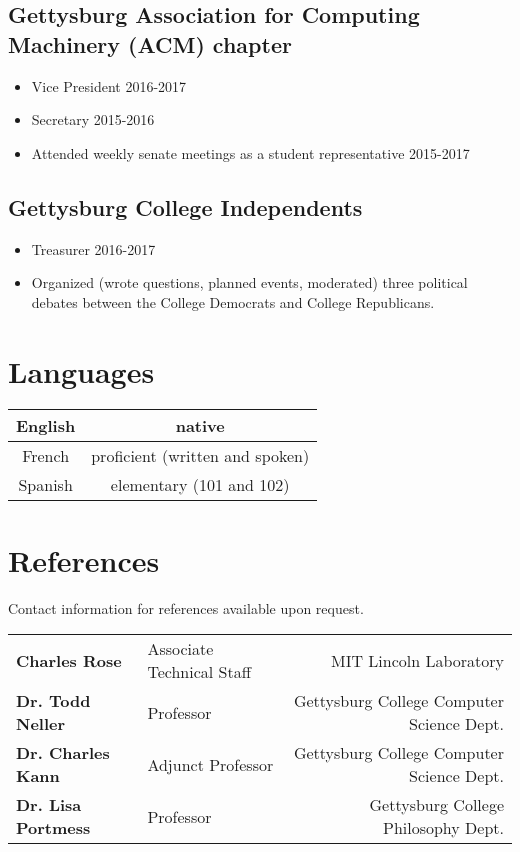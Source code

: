\documentclass[11pt]{article}
\begin{document}
\subsection*{Gettysburg Association for Computing Machinery (ACM) chapter}
\begin{itemize}[noitemsep]
\item Vice President \hfill 2016-2017
\item Secretary \hfill 2015-2016
\item Attended weekly senate meetings as a student representative \hfill 2015-2017
\end{itemize}
 
\subsection*{Gettysburg College Independents}
\begin{itemize}[noitemsep]
	\item Treasurer \hfill 2016-2017
    \item Organized (wrote questions, planned events, moderated) three political debates between the College Democrats and College Republicans. 
\end{itemize}

\section*{Languages}
\begin{tabular}{ | c | c | }
	\hline
	English & native  \\ 
	\hline
	French & proficient (written and spoken) \\  
	\hline
	Spanish & elementary (101 and 102) \\
	\hline
\end{tabular}

\section*{References}
Contact information for references available upon request.\\

\begin{tabular}{ l l r }
  	\textbf{Charles Rose} & Associate Technical Staff & MIT Lincoln Laboratory \\
  	\textbf{Dr. Todd Neller} & Professor & Gettysburg College Computer Science Dept. \\
  	\textbf{Dr. Charles Kann} & Adjunct Professor & Gettysburg College Computer Science Dept. \\
  	\textbf{Dr. Lisa Portmess} & Professor & Gettysburg College Philosophy Dept. \\
\end{tabular}

\end{document}
